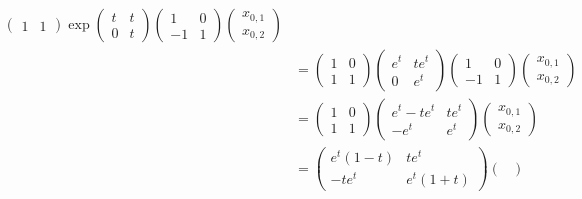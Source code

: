 \documentclass{article}
\begin{document}
\begin{itemize}
\begin{itemize}
\begin{align*}
\begin{pmatrix}
                1 & 1
            \end{pmatrix}\exp\begin{pmatrix}
                t & t\\
                0 & t
            \end{pmatrix}\begin{pmatrix}
                1 & 0\\
                -1 & 1
            \end{pmatrix}\begin{pmatrix}
                x_{0,1}\\
                x_{0,2}
            \end{pmatrix}\\
            &= \begin{pmatrix}
                1 & 0\\
                1 & 1
            \end{pmatrix}\begin{pmatrix}
                e^t & te^t\\
                0 & e^t
            \end{pmatrix}\begin{pmatrix}
                1 & 0\\
                -1 & 1
            \end{pmatrix}\begin{pmatrix}
                x_{0,1}\\
                x_{0,2}
            \end{pmatrix}\\
            &= \begin{pmatrix}
                1 & 0\\
                1 & 1
            \end{pmatrix}\begin{pmatrix}
                e^t - te^t & te^t\\
                -e^t & e^t
            \end{pmatrix}\begin{pmatrix}
                x_{0,1}\\
                x_{0,2}
            \end{pmatrix}\\
            &= \begin{pmatrix}
                e^t(1 - t) & te^t\\
                -te^t & e^t(1 + t)
            \end{pmatrix}\begin{pmatrix}

\end{pmatrix}
\end{align*}
\end{itemize}
\end{itemize}
\end{document}
